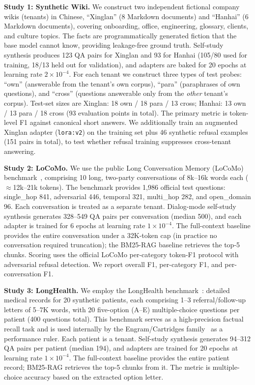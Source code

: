 \documentclass[conference]{IEEEtran}
\begin{document}
\textbf{Study 1: Synthetic Wiki.} We construct two independent fictional company wikis (tenants) in Chinese, ``Xinglan'' (8 Markdown documents) and ``Hanhai'' (6 Markdown documents), covering onboarding, office, engineering, glossary, clients, and culture topics. The facts are programmatically generated fiction that the base model cannot know, providing leakage-free ground truth. Self-study synthesis produces 123 QA pairs for Xinglan and 93 for Hanhai (105/80 used for training, 18/13 held out for validation), and adapters are baked for 20 epochs at learning rate $2 \times 10^{-4}$. For each tenant we construct three types of test probes: ``own'' (answerable from the tenant's own corpus), ``para'' (paraphrases of own questions), and ``cross'' (questions answerable only from the \emph{other} tenant's corpus). Test-set sizes are Xinglan: 18 own / 18 para / 13 cross; Hanhai: 13 own / 13 para / 18 cross (93 evaluation points in total). The primary metric is token-level F1 against canonical short answers. We additionally train an augmented Xinglan adapter (\texttt{lora:v2}) on the training set plus 46 synthetic refusal examples (151 pairs in total), to test whether refusal training suppresses cross-tenant answering.

\textbf{Study 2: LoCoMo.} We use the public Long Conversation Memory (LoCoMo) benchmark~\cite{jo2024locomo}, comprising 10 long, two-party conversations of 8k--16k words each ($\approx$12k--21k tokens). The benchmark provides 1{,}986 official test questions: single\_hop 841, adversarial 446, temporal 321, multi\_hop 282, and open\_domain 96. Each conversation is treated as a separate tenant. Dialog-mode self-study synthesis generates 328--549 QA pairs per conversation (median 500), and each adapter is trained for 6 epochs at learning rate $1 \times 10^{-4}$. The full-context baseline provides the entire conversation under a 32K-token cap (in practice no conversation required truncation); the BM25-RAG baseline retrieves the top-5 chunks. Scoring uses the official LoCoMo per-category token-F1 protocol with adversarial refusal detection. We report overall F1, per-category F1, and per-conversation F1.

\textbf{Study 3: LongHealth.} We employ the LongHealth benchmark~\cite{kbressem2024longhealth}: detailed medical records for 20 synthetic patients, each comprising 1--3 referral/follow-up letters of 5--7K words, with 20 five-option (A--E) multiple-choice questions per patient (400 questions total). This benchmark serves as a high-precision factual recall task and is used internally by the Engram/Cartridges family~\cite{hazy2025cartridges} as a performance ruler. Each patient is a tenant. Self-study synthesis generates 94--312 QA pairs per patient (median 194), and adapters are trained for 20 epochs at learning rate $1 \times 10^{-4}$. The full-context baseline provides the entire patient record; BM25-RAG retrieves the top-5 chunks from it. The metric is multiple-choice accuracy based on the extracted option letter.
\end{document}

